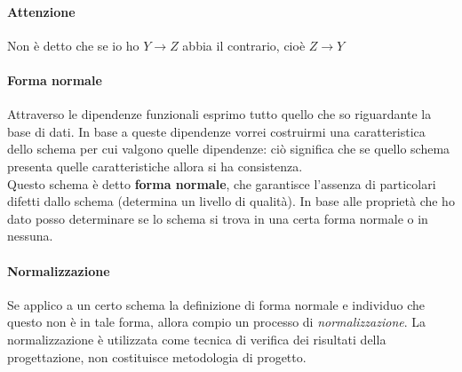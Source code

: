 \paragraph{Attenzione} Non è detto che se io ho $Y \longrightarrow Z$ abbia il contrario, cioè $Z \longrightarrow Y$

\paragraph{Forma normale}
Attraverso le dipendenze funzionali esprimo tutto quello che so riguardante la base di dati. In base a queste dipendenze vorrei costruirmi una caratteristica dello schema per cui valgono quelle dipendenze: ciò significa che se quello schema presenta quelle caratteristiche allora si ha consistenza.\\
Questo schema è detto \textbf{forma normale}, che garantisce l'assenza di particolari difetti dallo schema (determina un livello di qualità). In base alle proprietà che ho dato posso determinare se lo schema si trova in una certa forma normale o in nessuna.
\paragraph{Normalizzazione} Se applico a un certo schema la definizione di forma normale e individuo che questo non è in tale forma, allora compio un processo di \emph{normalizzazione}. La normalizzazione è utilizzata come tecnica di verifica dei risultati della progettazione, non costituisce metodologia di progetto.

